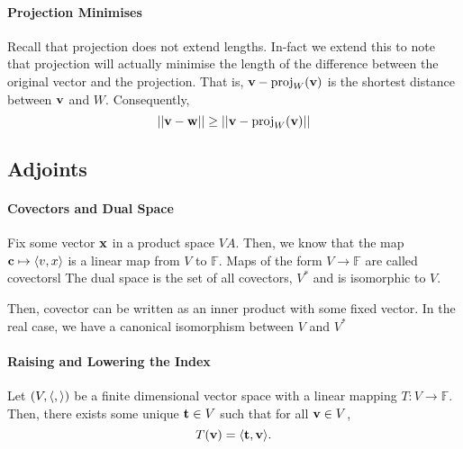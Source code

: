 \paragraph{Projection Minimises}
Recall that projection does not extend lengths.
In-fact we extend this to note that projection will actually minimise the length of
the difference between the original vector and the projection.
That is, \( \mathbf{v} - \mathrm{proj}_W(\mathbf{v}) \) is the shortest distance between \( \mathbf{v} \)
and \( W \).
Consequently, \[
    ||\mathbf{v} - \mathbf{w}|| \geq  ||\mathbf{v} - \mathrm{proj}_W(\mathbf{v})||
\]

\begin{center}
\end{center}

%
%
%
\subsection{Adjoints}

\paragraph{Covectors and Dual Space}
Fix some vector \( \mathbf{x} \) in a product space \( VA. \)
Then, we know that the map \( \mathbf{c} \mapsto \langle v, x \rangle \) is a linear map
from \( V \) to \( \mathbb{F} \).
Maps of the form \( V \to \mathbb{F} \) are called covectorsl
The dual space is the set of all covectors, \( V^* \) and is isomorphic to \( V \).

Then, covector can be written as an inner product with some fixed vector.
In the real case, we have a canonical isomorphism between \( V \) and \( V^* \)

\paragraph{Raising and Lowering the Index}

Let \( (V, \langle ,  \rangle) \) be a finite dimensional vector space
with a linear mapping \( T: V \to \mathbb{F} \).
Then, there exists some unique \( \mathbf{t} \in V \) such that for all \( \mathbf{v} \in V \),
\[
    T(\mathbf{v}) = \langle \mathbf{t}, \mathbf{v} \rangle.
\]

